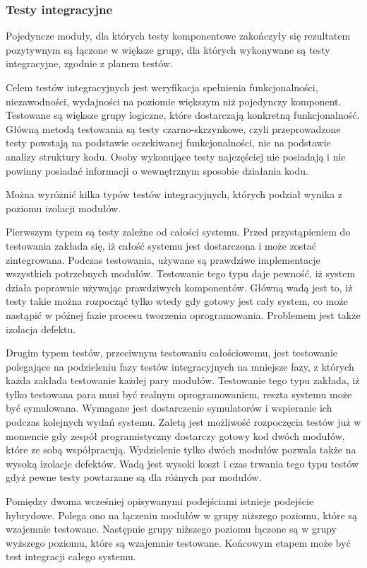 \subsubsection{Testy integracyjne} 
Pojedyncze moduły, dla których testy komponentowe zakończyły się rezultatem pozytywnym są łączone w większe grupy, dla których wykonywane są testy integracyjne, zgodnie z planem testów.

Celem testów integracyjnych jest weryfikacja spełnienia funkcjonalności, niezawodności, wydajności na poziomie większym niż pojedynczy komponent. Testowane są większe grupy logiczne, które dostarczają konkretną funkcjonalność. Główną metodą testowania są testy czarno-skrzynkowe, czyli przeprowadzone testy powstają na podstawie oczekiwanej funkcjonalności, nie na podstawie analizy struktury kodu. Osoby wykonujące testy najczęściej nie posiadają i nie powinny posiadać informacji o wewnętrznym sposobie działania kodu.

Można wyróżnić kilka typów testów integracyjnych, których podział wynika z poziomu izolacji modułów.

Pierwszym typem są testy zależne od całości systemu. Przed przystąpieniem do testowania zakłada się, iż całość systemu jest dostarczona i może zostać zintegrowana.  Podczas testowania, używane są prawdziwe implementacje wszystkich potrzebnych modułów. Testowanie tego typu daje pewność, iż system działa poprawnie używając prawdziwych komponentów. Główną wadą jest to, iż testy takie można rozpocząć tylko wtedy gdy gotowy jest cały system, co może nastąpić w późnej fazie procesu tworzenia oprogramowania. Problemem jest także izolacja defektu.

Drugim typem testów, przeciwnym testowaniu całościowemu, jest testowanie polegające na podzieleniu fazy testów integracyjnych na mniejsze fazy, z których każda zakłada testowanie każdej pary modułów. Testowanie tego typu zakłada, iż tylko testowana para musi być realnym oprogramowaniem, reszta systemu może być symulowana. Wymagane jest dostarczenie symulatorów i wspieranie ich podczas kolejnych wydań systemu. Zaletą jest możliwość rozpoczęcia testów już w momencie gdy zespół programistyczny dostarczy gotowy kod dwóch modułów, które ze sobą współpracują. Wydzielenie tylko dwóch modułów pozwala także na wysoką izolacje defektów. Wadą jest wysoki koszt i czas trwania tego typu testów gdyż pewne testy powtarzane są dla różnych par modułów.

Pomiędzy dwoma wcześniej opisywanymi podejściami istnieje podejście hybrydowe. Polega ono na łączeniu modułów w grupy niższego poziomu, które są wzajemnie testowane. Następnie grupy niższego poziomu łączone są w grupy wyższego poziomu, które są wzajemnie testowane. Końcowym etapem może być test integracji całego systemu.

